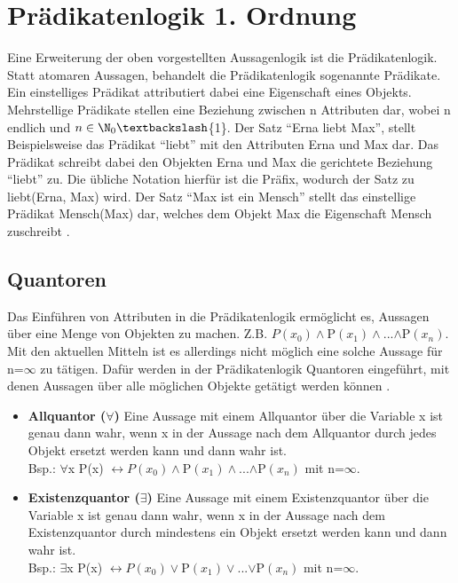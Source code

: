 \section{Prädikatenlogik 1. Ordnung}
Eine Erweiterung der oben vorgestellten Aussagenlogik ist die Prädikatenlogik. Statt atomaren Aussagen, behandelt die Prädikatenlogik sogenannte Prädikate. Ein einstelliges Prädikat attributiert dabei eine Eigenschaft eines Objekts. Mehrstellige Prädikate stellen eine Beziehung zwischen n Attributen dar, wobei n endlich und $n\in\N_{0}\textbackslash$\{1\}. Der Satz ``Erna liebt Max'', stellt Beispielsweise das Prädikat ``liebt'' mit den Attributen Erna und Max dar. Das Prädikat schreibt dabei den Objekten Erna und Max die gerichtete Beziehung ``liebt'' zu. Die übliche Notation hierfür ist die Präfix, wodurch der Satz zu liebt(Erna, Max) wird. Der Satz ``Max ist ein Mensch'' stellt das einstellige Prädikat Mensch(Max) dar, welches dem Objekt Max die Eigenschaft Mensch zuschreibt \cite{KB14}.

\subsection{Quantoren}
Das Einführen von Attributen in die Prädikatenlogik ermöglicht es, Aussagen über eine Menge von Objekten zu machen. Z.B. $P(x_{0})\wedge$P$(x_{1})\wedge$...$\wedge$P$(x_{n})$. Mit den aktuellen Mitteln ist es allerdings nicht möglich eine solche Aussage für n=$\infty$ zu tätigen. Dafür werden in der Prädikatenlogik Quantoren eingeführt, mit denen Aussagen über alle möglichen Objekte getätigt werden können \cite{KB14}.
\begin{itemize}
\item
\textbf{Allquantor ($\forall$)} Eine Aussage mit einem Allquantor über die Variable x ist genau dann wahr, wenn x in der Aussage nach dem Allquantor durch jedes Objekt ersetzt werden kann und dann wahr ist.\\
Bsp.: $\forall$x P(x) $\leftrightarrow P(x_{0})\wedge$P$(x_{1})\wedge$...$\wedge$P$(x_{n})$ mit n=$\infty$.

\item
\textbf{Existenzquantor ($\exists$)} Eine Aussage mit einem Existenzquantor über die Variable x ist genau dann wahr, wenn x in der Aussage nach dem Existenzquantor durch mindestens ein Objekt ersetzt werden kann und dann wahr ist.\\
Bsp.: $\exists$x P(x) $\leftrightarrow P(x_{0})\vee$P$(x_{1})\vee$...$\vee$P$(x_{n})$ mit n=$\infty$.
\end{itemize}

